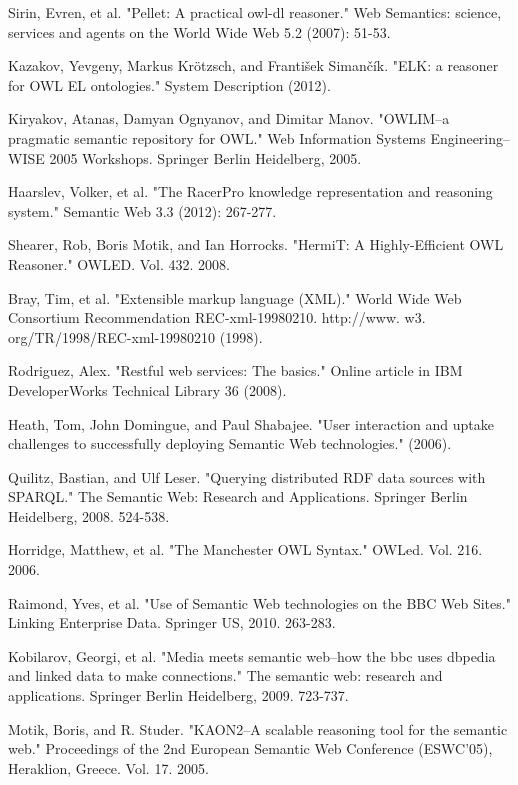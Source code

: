 \documentclass{article}
\begin{document}
\begin{thebibliography}{9}
  Sirin, Evren, et al. "Pellet: A practical owl-dl reasoner." Web Semantics:
  science, services and agents on the World Wide Web 5.2 (2007): 51-53.

  Kazakov, Yevgeny, Markus Krötzsch, and František Simančík. "ELK: a reasoner
  for OWL EL ontologies." System Description (2012).

  Kiryakov, Atanas, Damyan Ognyanov, and Dimitar Manov. "OWLIM–a pragmatic
  semantic repository for OWL." Web Information Systems Engineering–WISE 2005
  Workshops. Springer Berlin Heidelberg, 2005.

  Haarslev, Volker, et al. "The RacerPro knowledge representation and reasoning
  system." Semantic Web 3.3 (2012): 267-277.

  Shearer, Rob, Boris Motik, and Ian Horrocks. "HermiT: A Highly-Efficient OWL
  Reasoner." OWLED. Vol. 432. 2008.

  Bray, Tim, et al. 
  "Extensible markup language (XML)." 
  World Wide Web Consortium Recommendation REC-xml-19980210. 
  http://www. w3. org/TR/1998/REC-xml-19980210
  (1998).

  Rodriguez, Alex. 
  "Restful web services: The basics." 
  Online article in IBM DeveloperWorks Technical Library 36 (2008).

  Heath, Tom, John Domingue, and Paul Shabajee.
  "User interaction and uptake challenges to successfully deploying Semantic Web technologies." (2006).

  Quilitz, Bastian, and Ulf Leser. 
  "Querying distributed RDF data sources with SPARQL." 
  The Semantic Web: Research and Applications. Springer Berlin Heidelberg, 
  2008. 524-538.

  Horridge, Matthew, et al. "The Manchester OWL Syntax." OWLed. Vol. 216. 2006.

  Raimond, Yves, et al. "Use of Semantic Web technologies on the BBC Web Sites."
  Linking Enterprise Data. Springer US, 2010. 263-283.

  Kobilarov, Georgi, et al. "Media meets semantic web–how the bbc uses dbpedia
  and linked data to make connections." The semantic web: research and
  applications. Springer Berlin Heidelberg, 2009. 723-737.

  Motik, Boris, and R. Studer. "KAON2–A scalable reasoning tool for the semantic
  web." Proceedings of the 2nd European Semantic Web Conference (ESWC’05),
  Heraklion, Greece. Vol. 17. 2005.


\end{thebibliography}
\end{document}
